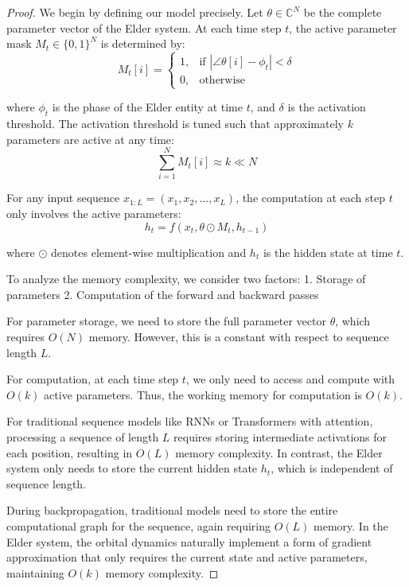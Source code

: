 \begin{proof}
We begin by defining our model precisely. Let $\theta \in \mathbb{C}^N$ be the complete parameter vector of the Elder system. At each time step $t$, the active parameter mask $M_t \in \{0,1\}^N$ is determined by:
\begin{equation}
M_t[i] = 
\begin{cases}
1, & \text{if } |\angle \theta[i] - \phi_t| < \delta \\
0, & \text{otherwise}
\end{cases}
\end{equation}

where $\phi_t$ is the phase of the Elder entity at time $t$, and $\delta$ is the activation threshold. The activation threshold is tuned such that approximately $k$ parameters are active at any time:
\begin{equation}
\sum_{i=1}^{N} M_t[i] \approx k \ll N
\end{equation}

For any input sequence $x_{1:L} = (x_1, x_2, \ldots, x_L)$, the computation at each step $t$ only involves the active parameters:
\begin{equation}
h_t = f(x_t, \theta \odot M_t, h_{t-1})
\end{equation}

where $\odot$ denotes element-wise multiplication and $h_t$ is the hidden state at time $t$.

To analyze the memory complexity, we consider two factors:
1. Storage of parameters
2. Computation of the forward and backward passes

For parameter storage, we need to store the full parameter vector $\theta$, which requires $O(N)$ memory. However, this is a constant with respect to sequence length $L$.

For computation, at each time step $t$, we only need to access and compute with $O(k)$ active parameters. Thus, the working memory for computation is $O(k)$.

For traditional sequence models like RNNs or Transformers with attention, processing a sequence of length $L$ requires storing intermediate activations for each position, resulting in $O(L)$ memory complexity. In contrast, the Elder system only needs to store the current hidden state $h_t$, which is independent of sequence length.

During backpropagation, traditional models need to store the entire computational graph for the sequence, again requiring $O(L)$ memory. In the Elder system, the orbital dynamics naturally implement a form of gradient approximation that only requires the current state and active parameters, maintaining $O(k)$ memory complexity.


\end{proof}
